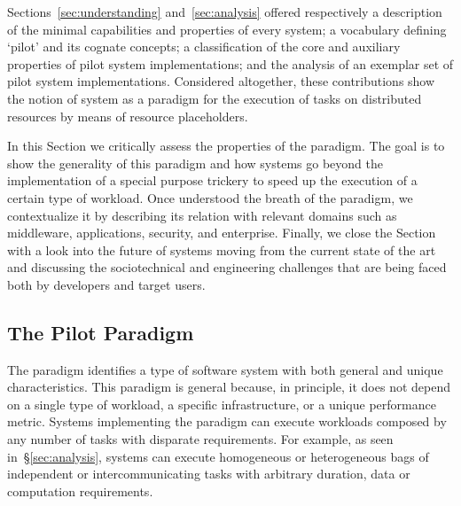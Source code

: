 \documentclass{sig-alternate}
\begin{document}

Sections~\ref{sec:understanding} and~\ref{sec:analysis} offered respectively a
description of the minimal capabilities and properties of every \pilot system;
a vocabulary defining `pilot' and its cognate concepts; a classification of the
core and auxiliary properties of pilot system implementations; and the analysis
of an exemplar set of pilot system implementations. Considered altogether,
these contributions show the notion of \pilot system as a paradigm for the
execution of tasks on distributed resources by means of resource placeholders.

In this Section we critically assess the properties of the \pilot paradigm. The
goal is to show the generality of this paradigm and how \pilot systems go
beyond the implementation of a special purpose trickery to speed up the
execution of a certain type of workload. Once understood the breath of the
\pilot paradigm, we contextualize it by describing its relation with relevant
domains such as middleware, applications, security, and enterprise. Finally, we
close the Section with a look into the future of \pilot systems moving from the
current state of the art and discussing the sociotechnical and engineering
challenges that are being faced both by developers and target users.


\subsection{The Pilot Paradigm}
\label{sec:5.1}

The \pilot paradigm identifies a type of software system with both general and
unique characteristics. This paradigm is general because, in principle, it does
not depend on a single type of workload, a specific infrastructure, or a unique
performance metric. Systems implementing the \pilot paradigm can execute
workloads composed by any number of tasks with disparate requirements. For
example, as seen in~\S\ref{sec:analysis}, \pilot systems can execute
homogeneous or heterogeneous bags of independent or intercommunicating tasks
with arbitrary duration, data or computation requirements.
\end{document}
